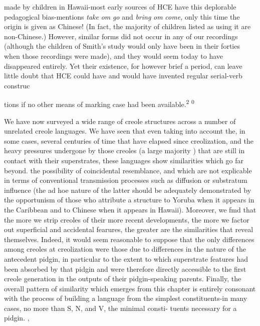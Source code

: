 
made by children in Hawaii-most early sources of HCE have this deplorable pedagogical bias-mentions \textit{take} \textit{om} \textit{go} and \textit{bring} \textit{om} \textit{come,} only this time the origin is given as Chinese! (In fact, the majority of children listed as using it are non-Chinese.) However, similar forms did not occur in any of our recordings (although the children of Smith's study would only have been in their forties when those recordings were made), and they would seem today to have disappeared entirely. Yet their existence, for however brief a period, can leave little doubt that HCE could have and would have invented regular serial-verb construc\-

tions if no other means of marking case had been available.\textsuperscript{2} \textsuperscript{0}

We have now surveyed a wide range of creole structures across a number of unrelated creole languages. We have seen that even taking into account the, in some cases, several centuries of time that have elapsed since creolization, and the heavy pressures undergone by those creoles (a large majority ) that are still in contact with their superstrates, these languages show similarities which go far beyond. the possibility of coincidental resemblance, and which are not explicable in terms of conventional transmission processes such as diffusion or substratum influence (the ad hoe nature of the latter should be ade\-quately demonstrated by the opportunism of those who attribute a structure to Yoruba when it appears in the Caribbean and to Chinese when it appears in Hawaii). Moreover, we fmd that the more we strip creoles of their more recent developments, the more we factor out superficial and accidental fearures, the greater are the similarities that reveal themselves. Indeed, it would seem reasonable to suppose that the only differences among creoles at creolization were those due to differences in the nature of the antecedent pidgin, in particular to the extent to which superstrate features had been absorbed by that pidgin and were therefore directly accessible to the first creole generation in the outputs of their pidgin-speaking parents. Finally, the overall pattern of similarity which emerges from this chapter is entirely conso\-nant with the process of building a language from the simplest consti\-tuents-in many cases, no more than S, N, and V, the minimal consti{}- tuents necessary for a pidgin. ,


